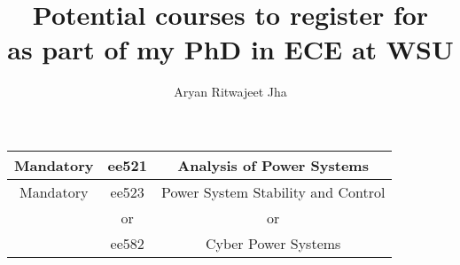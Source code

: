 \documentclass{article}
\author{Aryan Ritwajeet Jha}
\date{}
\title{Potential courses to register for \\ as part of my PhD in ECE at WSU}
\begin{document}
	\maketitle
	
	\begin{tabular}{|c|c|c|}
		\hline
		Mandatory & ee521 & Analysis of Power Systems \\
		\hline
		Mandatory & ee523 & Power System Stability and Control \\
		 & or & or \\
		 & ee582 & Cyber Power Systems \\
		
		\hline
	\end{tabular}
\end{document}
